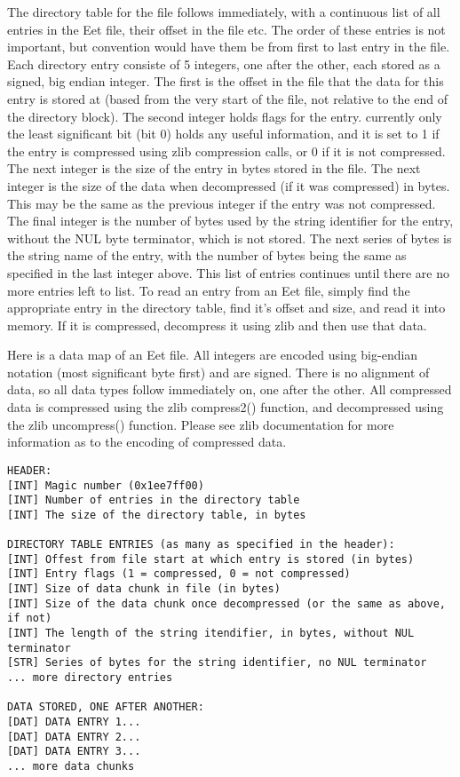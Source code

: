 The directory table for the file follows immediately, with a continuous list of all entries in the Eet file, their offset in the file etc. The order of these entries is not important, but convention would have them be from first to last entry in the file. Each directory entry consiste of 5 integers, one after the other, each stored as a signed, big endian integer. The first is the offset in the file that the data for this entry is stored at (based from the very start of the file, not relative to the end of the directory block). The second integer holds flags for the entry. currently only the least significant bit (bit 0) holds any useful information, and it is set to 1 if the entry is compressed using zlib compression calls, or 0 if it is not compressed. The next integer is the size of the entry in bytes stored in the file. The next integer is the size of the data when decompressed (if it was compressed) in bytes. This may be the same as the previous integer if the entry was not compressed. The final integer is the number of bytes used by the string identifier for the entry, without the NUL byte terminator, which is not stored. The next series of bytes is the string name of the entry, with the number of bytes being the same as specified in the last integer above. This list of entries continues until there are no more entries left to list. To read an entry from an Eet file, simply find the appropriate entry in the directory table, find it's offset and size, and read it into memory. If it is compressed, decompress it using zlib and then use that data.

Here is a data map of an Eet file. All integers are encoded using big-endian notation (most significant byte first) and are signed. There is no alignment of data, so all data types follow immediately on, one after the other. All compressed data is compressed using the zlib compress2() function, and decompressed using the zlib uncompress() function. Please see zlib documentation for more information as to the encoding of compressed data.



\footnotesize\begin{verbatim}
HEADER:
[INT] Magic number (0x1ee7ff00)
[INT] Number of entries in the directory table
[INT] The size of the directory table, in bytes

DIRECTORY TABLE ENTRIES (as many as specified in the header):
[INT] Offest from file start at which entry is stored (in bytes)
[INT] Entry flags (1 = compressed, 0 = not compressed)
[INT] Size of data chunk in file (in bytes)
[INT] Size of the data chunk once decompressed (or the same as above, if not)
[INT] The length of the string itendifier, in bytes, without NUL terminator
[STR] Series of bytes for the string identifier, no NUL terminator
... more directory entries

DATA STORED, ONE AFTER ANOTHER:
[DAT] DATA ENTRY 1...
[DAT] DATA ENTRY 2...
[DAT] DATA ENTRY 3...
... more data chunks
\end{verbatim}
\normalsize



